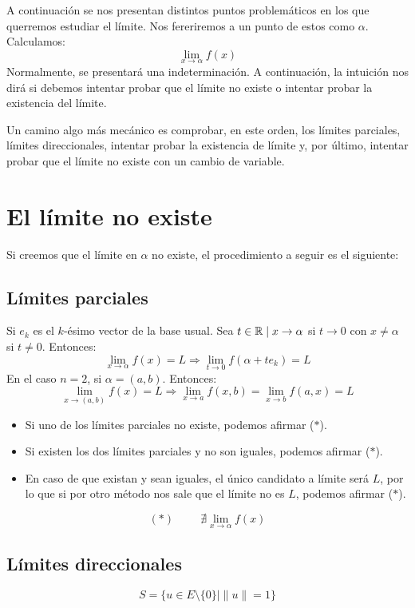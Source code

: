 A continuación se nos presentan distintos puntos problemáticos en los que querremos
estudiar el límite. Nos fereriremos a un punto de estos como $\alpha$.
Calculamos:
$$\lim_{x \to \alpha} f(x)$$
Normalmente, se presentará una indeterminación. A continuación, la intuición nos dirá
si debemos intentar probar que el límite no existe o intentar probar la existencia del límite.


Un camino algo más mecánico es comprobar, en este orden, los límites parciales, límites direccionales,
intentar probar la existencia de límite y, por último, intentar probar que el límite no
existe con un cambio de variable.

\section{El límite no existe}

Si creemos que el límite en $\alpha$ no existe, el procedimiento a seguir es el siguiente:

\subsection{Límites parciales}

Si $e_k$ es el $k$-ésimo vector de la base usual. Sea $t \in \mathbb R \mid x \rightarrow \alpha$ si
$t \rightarrow 0$ con $x \neq \alpha$ si $t \neq 0$. Entonces:
$$\lim_{x \to \alpha}f(x) = L \Rightarrow \lim_{t \to 0}f(\alpha + te_k)=L$$
En el caso $n=2$, si $\alpha = (a,b)$. Entonces:
$$\lim_{x \to (a,b)}f(x) = L \Rightarrow \lim_{x \rightarrow a}f(x,b) = \lim_{x \rightarrow b}f(a,x)=L$$

\begin{itemize}
    \item Si uno de los límites parciales no existe, podemos afirmar ($\ast$).
    \item Si existen los dos límites parciales y no son iguales, podemos afirmar ($\ast$).
    \item En caso de que existan y sean iguales, el único candidato a límite será $L$, por lo que si por
          otro método nos sale que el límite no es $L$, podemos afirmar ($\ast$).
\end{itemize}
$$(\ast)\hspace{1cm}\nexists \lim_{x \to \alpha}f(x)$$

\subsection{Límites direccionales}
$$S = \{u \in E\setminus\{0\} \mid \|u\| = 1\}$$


